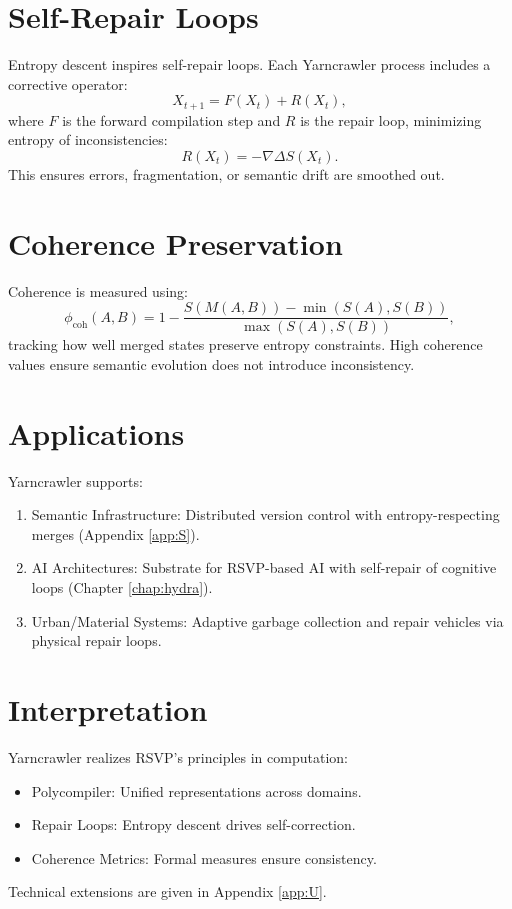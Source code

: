 \documentclass[12pt]{report}
\begin{document}
\section{Self-Repair Loops}
Entropy descent inspires self-repair loops. Each Yarncrawler process includes a corrective operator:
\[
X_{t+1} = F(X_t) + R(X_t),
\]
where \(F\) is the forward compilation step and \(R\) is the repair loop, minimizing entropy of inconsistencies:
\[
R(X_t) = - \nabla \Delta S(X_t).
\]
This ensures errors, fragmentation, or semantic drift are smoothed out.

\section{Coherence Preservation}
Coherence is measured using:
\[
\phi_{\text{coh}}(A,B) = 1 - \frac{S(M(A,B)) - \min(S(A),S(B))}{\max(S(A),S(B))},
\]
tracking how well merged states preserve entropy constraints. High coherence values ensure semantic evolution does not introduce inconsistency.

\section{Applications}
Yarncrawler supports:
\begin{enumerate}
    \item Semantic Infrastructure: Distributed version control with entropy-respecting merges (Appendix \ref{app:S}).
    \item AI Architectures: Substrate for RSVP-based AI with self-repair of cognitive loops (Chapter \ref{chap:hydra}).
    \item Urban/Material Systems: Adaptive garbage collection and repair vehicles via physical repair loops.
\end{enumerate}

\section{Interpretation}
Yarncrawler realizes RSVP’s principles in computation:
\begin{itemize}
    \item Polycompiler: Unified representations across domains.
    \item Repair Loops: Entropy descent drives self-correction.
    \item Coherence Metrics: Formal measures ensure consistency.
\end{itemize}
Technical extensions are given in Appendix \ref{app:U}.
\end{document}
